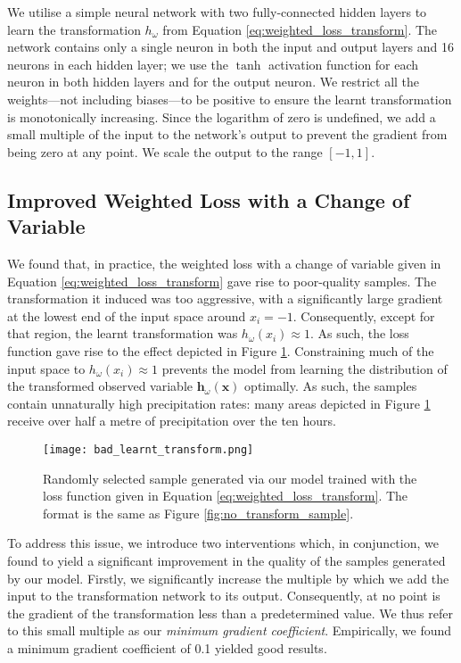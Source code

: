 \documentclass[ oneside,%
                    author={George Herbert},
                    degree={MSci},
                     title={Diffusion Models for Time-Evolving Precipitation Fields},
                  subtitle={}]{dissertation}
\begin{document}
We utilise a simple neural network with two fully-connected hidden layers to learn the transformation $h_\omega$ from Equation \ref{eq:weighted_loss_transform}. The network contains only a single neuron in both the input and output layers and 16 neurons in each hidden layer; we use the $\tanh$ activation function for each neuron in both hidden layers and for the output neuron. We restrict all the weights---not including biases---to be positive to ensure the learnt transformation is monotonically increasing. Since the logarithm of zero is undefined, we add a small multiple of the input to the network's output to prevent the gradient from being zero at any point. We scale the output to the range $[-1,1]$.

\subsection{Improved Weighted Loss with a Change of Variable}

We found that, in practice, the weighted loss with a change of variable given in Equation \ref{eq:weighted_loss_transform} gave rise to poor-quality samples. The transformation it induced was too aggressive, with a significantly large gradient at the lowest end of the input space around $x_i=-1$. Consequently, except for that region, the learnt transformation was $h_\omega(x_i)\approx 1$. As such, the loss function gave rise to the effect depicted in Figure \ref{fig:bad_learnt_transform}. Constraining much of the input space to $h_\omega(x_i)\approx 1$ prevents the model from learning the distribution of the transformed observed variable $\mathbf{h}_\omega(\mathbf{x})$ optimally. As such, the samples contain unnaturally high precipitation rates: many areas depicted in Figure \ref{fig:bad_learnt_transform} receive over half a metre of precipitation over the ten hours.

\begin{figure}[htbp]
      \centering
      \texttt{[image: bad\_learnt\_transform.png]}
      \caption{Randomly selected sample generated via our model trained with the loss function given in Equation \ref{eq:weighted_loss_transform}. The format is the same as Figure \ref{fig:no_transform_sample}.}
      \label{fig:bad_learnt_transform}
\end{figure}

To address this issue, we introduce two interventions which, in conjunction, we found to yield a significant improvement in the quality of the samples generated by our model. Firstly, we significantly increase the multiple by which we add the input to the transformation network to its output. Consequently, at no point is the gradient of the transformation less than a predetermined value. We thus refer to this small multiple as our \textit{minimum gradient coefficient}. Empirically, we found a minimum gradient coefficient of 0.1 yielded good results.
\end{document}
